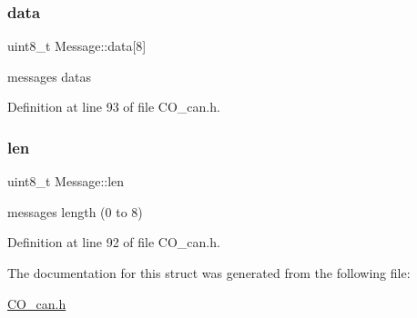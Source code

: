\mbox{\label{struct_message_a605b149e9987071433ebb36b43353526}} 
\subsubsection{\texorpdfstring{data}{data}}
{\footnotesize\ttfamily uint8\+\_\+t Message\+::data\mbox{[}8\mbox{]}}

message\textquotesingle{}s datas 

Definition at line 93 of file C\+O\+\_\+can.\+h.

\mbox{\label{struct_message_a0e2f37b0ed471c18c4d1a71a23981c23}} 
\subsubsection{\texorpdfstring{len}{len}}
{\footnotesize\ttfamily uint8\+\_\+t Message\+::len}

message\textquotesingle{}s length (0 to 8) 

Definition at line 92 of file C\+O\+\_\+can.\+h.



The documentation for this struct was generated from the following file\+:\begin{DoxyCompactItemize}
\item 
\mbox{\hyperlink{_c_o__can_8h}{C\+O\+\_\+can.\+h}}\end{DoxyCompactItemize}

